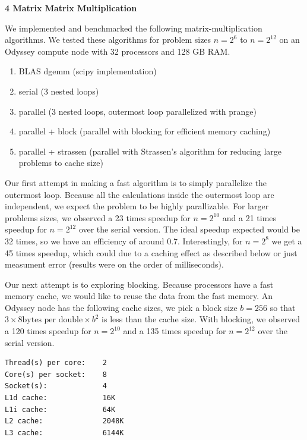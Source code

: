 \documentclass[11pt]{article}
\newcommand{\problem}{\FloatBarrier \medskip \noindent \textbf}
\begin{document}
\problem{4 Matrix Matrix Multiplication}

We implemented and benchmarked the following matrix-multiplication algorithms.
We tested these algorithms for problem sizes $n=2^{6}$ to $n=2^{12}$ on an Odyssey compute node with 32 processors and 128 GB RAM.

\begin{enumerate}
\item BLAS dgemm (scipy implementation)
\item serial (3 nested loops)
\item parallel (3 nested loops, outermost loop parallelized with prange)
\item parallel + block (parallel with blocking for efficient memory caching)
\item parallel + strassen (parallel with Strassen's algorithm for reducing large problems to cache size)
\end{enumerate}

Our first attempt in making a fast algorithm is to simply parallelize the outermost loop.
Because all the calculations inside the outermost loop are independent, we expect the problem to be highly parallizable.
For larger problems sizes, we observed a 23 times speedup for $n = 2^{10}$ and a 21 times speedup for $n = 2^{12}$ over the serial version.
The ideal speedup expected would be 32 times, so we have an efficiency of around 0.7.
Interestingly, for $n= 2^8$ we get a 45 times speedup, which could due to a caching effect as described below or just measument error (results were on the order of milliseconds).

Our next attempt is to exploring blocking.
Because processors have a fast memory cache, we would like to reuse the data from the fast memory.
An Odyssey node has the following cache sizes, we pick a block size $b=256$ so that $3 \times 8 \textrm{bytes per double} \times b^2$ is less than the cache size.
With blocking, we observed a 120 times speedup for $n = 2^{10}$ and a 135 times speedup for $n = 2^{12}$ over the serial version.
\begin{verbatim}
Thread(s) per core:    2
Core(s) per socket:    8
Socket(s):             4
L1d cache:             16K
L1i cache:             64K
L2 cache:              2048K
L3 cache:              6144K
\end{verbatim}
\end{document}

